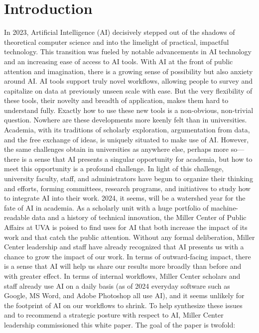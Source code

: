 \documentclass[12pt, oneside]{article}   	%
\begin{document}
\section{Introduction}\label{section.introduction}
In 2023, Artificial Intelligence (AI) decisively stepped out of the shadows of theoretical computer science and into the limelight of practical, impactful technology. This transition was fueled by notable advancements in AI technology and an increasing ease of access to AI tools.  With AI at the front of public attention and imagination, there is a growing sense of possibility but also anxiety around AI.  AI tools support truly novel workflows, allowing people to survey and capitalize on data at previously unseen scale with ease.  But the very flexibility of these tools, their novelty and breadth of application, makes them hard to understand fully.  Exactly how to use these new tools is a non-obvious, non-trivial question.
Nowhere are these developments more keenly felt than in universities.  Academia, with its traditions of scholarly exploration, argumentation from data, and the free exchange of ideas, is uniquely situated to make use of AI.  However, the same challenges obtain in universities as anywhere else, perhaps more so—there is a sense that AI presents a singular opportunity for academia, but how to meet this opportunity is a profound challenge.  In light of this challenge, university faculty, staff, and administrators have begun to organize their thinking and efforts, forming committees, research programs, and initiatives to study how to integrate AI into their work.  2024, it seems, will be a watershed year for the fate of AI in academia.
As a scholarly unit with a huge portfolio of machine-readable data and a history of technical innovation, the Miller Center of Public Affairs at UVA is poised to find uses for AI that both increase the impact of its work and that catch the public attention.   Without any formal deliberation, Miller Center leadership and staff have already recognized that AI presents us with a chance to grow the impact of our work.  In terms of outward-facing impact, there is a sense that AI will help us share our results more broadly than before and with greater effect.  In terms of internal workflows, Miller Center scholars and staff already use AI on a daily basis (as of 2024 everyday software such as Google, MS Word, and Adobe Photoshop all use AI), and it seems unlikely for the footprint of AI on our workflows to shrink.
To help synthesize these issues and to recommend a strategic posture with respect to AI, Miller Center leadership commissioned this white paper.  The goal of the paper is twofold:
\end{document}
